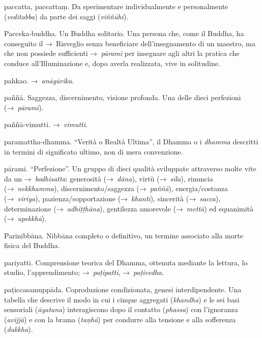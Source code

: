 \begin{glossarydescription}
\item[paccatta, paccattaṃ.] Da sperimentare individualmente e
  personalmente (\emph{veditabba}) da parte dei saggi (\emph{viññūhi}).

\item[Pacceka-buddha.] Un Buddha solitario. Una persona che, come il
  Buddha, ha conseguito il →~Risveglio senza beneficiare dell'insegnamento di un
  maestro, ma che non possiede sufficienti →~\emph{pāramī} per insegnare agli
  altri la pratica che conduce all'Illuminazione e, dopo averla realizzata, vive
  in solitudine.

\item[pahkao.] →~\emph{anāgārika}.

\item[paññā.] Saggezza, discernimento, visione profonda. Una delle dieci
  perfezioni (→~\emph{pāramī}).

\item[paññā-vimutti.] →~\emph{vimutti}.

\item[paramattha-dhamma.] ``Verità o Realtà Ultima'', il Dhamma o i
  \emph{dhamma} descritti in termini di significato ultimo, non di mera
  convenzione.

\item[pāramī.]\label{glossary-parami} ``Perfezione''. Un gruppo di dieci qualità sviluppate
  attraverso molte vite da un →~\emph{bodhisatta}: generosità (→~\emph{dāna}),
  virtù (→~\emph{sīla}), rinuncia (→~\emph{nekkhamma}), discernimento/saggezza
  (→~\emph{paññā}), energia/costanza (→~\emph{viriya}), pazienza/sopportazione
  (→~\emph{khanti}), sincerità (→~\emph{sacca}), determinazione
  (→~\emph{adhiṭṭhāna}), gentilezza amorevole (→~\emph{mettā}) ed equanimità
  (→~\emph{upekkhā}).

\item[Parinibbāna.] Nibbāna completo o definitivo, un termine
  associato alla morte fisica del Buddha.

\item[pariyatti.] Comprensione teorica del Dhamma, ottenuta mediante la
  lettura, lo studio, l'apprendimento; →~\emph{paṭipatti}, →~\emph{paṭivedha}.

\item[paṭiccasamuppāda.] Coproduzione condizionata, genesi
  interdipendente. Una tabella che descrive il modo in cui i cinque aggregati
  (\emph{khandha}) e le sei basi sensoriali (\emph{āyatana}) interagiscono dopo
  il contatto (\emph{phassa}) con l'ignoranza (\emph{avijjā}) e con la brama
  (\emph{taṇhā}) per condurre alla tensione e alla sofferenza (\emph{dukkha}).


\end{glossarydescription}
